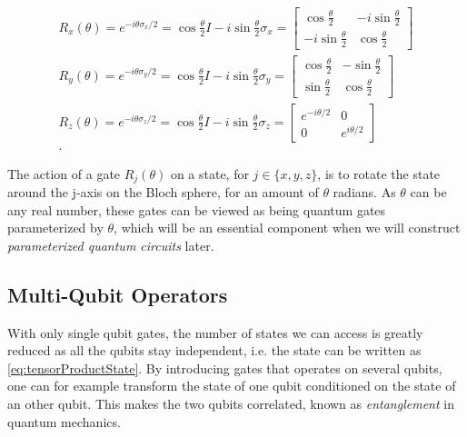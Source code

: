 \begin{equation}\label{eq:PauliRotations}
\begin{aligned}
    R_x(\theta) = e^{-i\theta\sigma_x/2} = \cos{\frac{\theta}{2}}I - i\sin{\frac{\theta}{2}}\sigma_x
    =
    \begin{bmatrix}
        \cos{\frac{\theta}{2}} & -i\sin{\frac{\theta}{2}} \\
        -i\sin{\frac{\theta}{2}} & \cos{\frac{\theta}{2}}
    \end{bmatrix}\\
    R_y(\theta) = e^{-i\theta\sigma_y/2} = \cos{\frac{\theta}{2}}I - i\sin{\frac{\theta}{2}}\sigma_y
    =
    \begin{bmatrix}
        \cos{\frac{\theta}{2}} & -\sin{\frac{\theta}{2}} \\
        \sin{\frac{\theta}{2}} & \cos{\frac{\theta}{2}}
    \end{bmatrix}\\
    R_z(\theta) = e^{-i\theta\sigma_z/2} = \cos{\frac{\theta}{2}}I - i\sin{\frac{\theta}{2}}\sigma_z
    =
    \begin{bmatrix}
        e^{-i\theta/2} & 0 \\
        0 & e^{i\theta/2}
    \end{bmatrix}\\.
\end{aligned}    
\end{equation}

The action of a gate $R_j(\theta)$ on a state, for $j \in \{x,y,z\}$, is to rotate the state around the j-axis on the Bloch sphere, for an amount of $\theta$ radians. As $\theta$ can be any real number, these gates can be viewed as being quantum gates parameterized by $\theta$, which will be an essential component when we will construct \emph{parameterized quantum circuits} later.

\subsection{Multi-Qubit Operators}\label{sec:ControlledOperations}
With only single qubit gates, the number of states we can access is greatly reduced as all the qubits stay independent, i.e. the state can be written as \autoref{eq:tensorProductState}. By introducing gates that operates on several qubits, one can for example transform the state of one qubit conditioned on the state of an other qubit. This makes the two qubits correlated, known as \emph{entanglement} in quantum mechanics.

